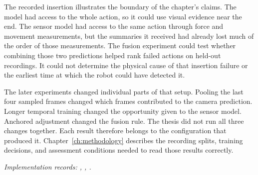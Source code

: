 The recorded insertion illustrates the boundary of the chapter’s claims. The model had access to the whole action, so it could use visual evidence near the end. The sensor model had access to the same action through force and movement measurements, but the summaries it received had already lost much of the order of those measurements. The fusion experiment could test whether combining those two predictions helped rank failed actions on held-out recordings. It could not determine the physical cause of that insertion failure or the earliest time at which the robot could have detected it.

The later experiments changed individual parts of that setup. Pooling the last four sampled frames changed which frames contributed to the camera prediction. Longer temporal training changed the opportunity given to the sensor model. Anchored adjustment changed the fusion rule. The thesis did not run all three changes together. Each result therefore belongs to the configuration that produced it. Chapter~\ref{ch:methodology} describes the recording splits, training decisions, and assessment conditions needed to read those results correctly.

\textit{Implementation records: , , .}
